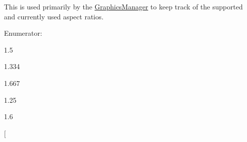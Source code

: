 This is used primarily by the \hyperlink{classMezzanine_1_1GraphicsManager}{GraphicsManager} to keep track of the supported and currently used aspect ratios. 

\begin{Desc}
\item[Enumerator: ]\par
\begin{description}
\item[{\em 
\hypertarget{namespaceMezzanine_a4f14cccd98d1bdc1bf934c1c028e3eafa4f3ca4673d11774b77de4b1c51be122b}{
AR\_\-3\_\-By\_\-2}
\label{namespaceMezzanine_a4f14cccd98d1bdc1bf934c1c028e3eafa4f3ca4673d11774b77de4b1c51be122b}
}]1.5 \item[{\em 
\hypertarget{namespaceMezzanine_a4f14cccd98d1bdc1bf934c1c028e3eafaa7ca7a1749373d75bec977396ea8af3c}{
AR\_\-4\_\-By\_\-3}
\label{namespaceMezzanine_a4f14cccd98d1bdc1bf934c1c028e3eafaa7ca7a1749373d75bec977396ea8af3c}
}]1.334 \item[{\em 
\hypertarget{namespaceMezzanine_a4f14cccd98d1bdc1bf934c1c028e3eafaac26ee01f52f68b3a67beccc4ee4f950}{
AR\_\-5\_\-By\_\-3}
\label{namespaceMezzanine_a4f14cccd98d1bdc1bf934c1c028e3eafaac26ee01f52f68b3a67beccc4ee4f950}
}]1.667 \item[{\em 
\hypertarget{namespaceMezzanine_a4f14cccd98d1bdc1bf934c1c028e3eafae7297c6f8720aa5453ea9cbc270ec149}{
AR\_\-5\_\-By\_\-4}
\label{namespaceMezzanine_a4f14cccd98d1bdc1bf934c1c028e3eafae7297c6f8720aa5453ea9cbc270ec149}
}]1.25 \item[{\em 
\hypertarget{namespaceMezzanine_a4f14cccd98d1bdc1bf934c1c028e3eafaad0586105b44a5d1b093a8d072d3e297}{
AR\_\-8\_\-By\_\-5}
\label{namespaceMezzanine_a4f14cccd98d1bdc1bf934c1c028e3eafaad0586105b44a5d1b093a8d072d3e297}
}]1.6 \item[{\em 
}
\end{description}
\end{Desc}
